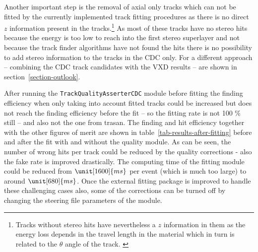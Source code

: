 Another important step is the removal of axial only tracks which can not be fitted by the currently implemented track fitting procedures as there is no direct $z$ information present in the tracks.\footnote{Tracks without stereo hits have nevertheless a $z$ information in them as the energy loss depends in the travel length in the material which in turn is related to the $\theta$ angle of the track. \cite{martin}} As most of these tracks have no stereo hits because the energy is too low to reach into the first stereo superlayer and not because the track finder algorithms have not found the hits there is no possibility to add stereo information to the tracks in the CDC only. For a different approach -- combining the CDC track candidates with the VXD results -- are shown in section~\ref{section-outlook}.

After running the \texttt{Track\-Quality\-Asserter\-CDC} module before fitting the finding efficiency when only taking into account fitted tracks could be increased but does not reach the finding efficiency before the fit -- so the fitting rate is not 100 \% still -- and also not the one from trasan. The finding and hit efficiency together with the other figures of merit are shown in table~\ref{tab-results-after-fitting} before and after the fit with and without the quality module. As can be seen, the number of wrong hits per track could be reduced by the quality corrections - also the fake rate is improved drastically. The computing time of the fitting module could be reduced from $\unit[1600]{ms}$ per event (which is much too large) to around $\unit[680]{ms}$. Once the external fitting package is improved to handle these challenging cases also, some of the corrections can be turned off by changing the steering file parameters of the module.


